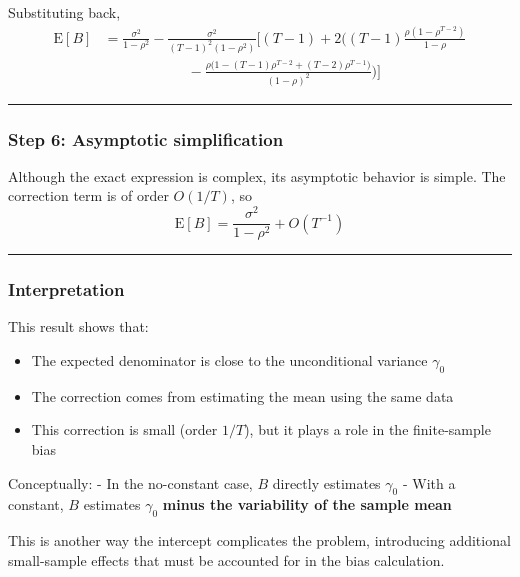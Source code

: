 \documentclass[11pt]{article}
\providecommand{\tightlist}{%
      \setlength{\itemsep}{0pt}\setlength{\parskip}{0pt}}
\begin{document}
Substituting back, \[
\begin{aligned}
\text{E}[B]
&=
\frac{\sigma^2}{1-\rho^2}
-
\frac{\sigma^2}{(T-1)^2(1-\rho^2)}
\Bigg[
(T-1)
+
2\Bigg(
(T-1)\frac{\rho(1-\rho^{T-2})}{1-\rho}\\
&\qquad\qquad\qquad
-
\frac{\rho\big(1-(T-1)\rho^{T-2}+(T-2)\rho^{T-1}\big)}{(1-\rho)^2}
\Bigg)
\Bigg]
\end{aligned}
\]

\begin{center}\rule{0.5\linewidth}{0.5pt}\end{center}

\subsubsection{Step 6: Asymptotic
simplification}\label{step-6-asymptotic-simplification}

Although the exact expression is complex, its asymptotic behavior is
simple. The correction term is of order \(O(1/T)\), so \[
\text{E}[B] = \frac{\sigma^2}{1-\rho^2} + O\!\left(T^{-1}\right)
\]

\begin{center}\rule{0.5\linewidth}{0.5pt}\end{center}

\subsubsection{Interpretation}\label{interpretation}

This result shows that:

\begin{itemize}
\tightlist
\item
  The expected denominator is close to the unconditional variance
  \(\gamma_0\)
\item
  The correction comes from estimating the mean using the same data
\item
  This correction is small (order \(1/T\)), but it plays a role in the
  finite-sample bias
\end{itemize}

Conceptually: - In the no-constant case, \(B\) directly estimates
\(\gamma_0\) - With a constant, \(B\) estimates \(\gamma_0\)
\textbf{minus the variability of the sample mean}

This is another way the intercept complicates the problem, introducing
additional small-sample effects that must be accounted for in the bias
calculation.
\end{document}
